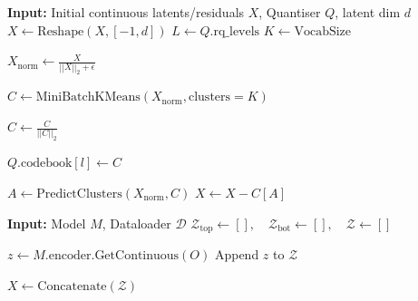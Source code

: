 \label{sec:codebook-priors}

\begin{algorithm}
\caption{Data-driven Codebook Initialisation via K-Means.}
\label{alg:codebook-priors}
\begin{algorithmic}[1]
    \State \textbf{Input:} Initial continuous latents/residuals $X$, Quantiser $Q$, latent dim $d$
    \State $X \gets \text{Reshape}(X, [-1, d])$ 
    \State $L \gets Q.\text{rq\_levels}$
    \State $K \gets \text{VocabSize}$
    
        \State $X_{\text{norm}} \gets \frac{X}{||X||_2 + \epsilon}$ 
        
        \State $C \gets \text{MiniBatchKMeans}(X_{\text{norm}}, \text{clusters}=K)$ 
        
            \State $C \gets \frac{C}{||C||_2}$ 
        \EndIf
        
        \State $Q.\text{codebook}[l] \gets C$ 
        
        \State $A \gets \text{PredictClusters}(X_{\text{norm}}, C)$ 
        \State $X \gets X - C[A]$ 
    \EndFor
\EndProcedure

\vspace{2mm}

    \State \textbf{Input:} Model $M$, Dataloader $\mathcal{D}$
    \State $\mathcal{Z}_{\text{top}} \gets [], \quad \mathcal{Z}_{\text{bot}} \gets [], \quad \mathcal{Z} \gets []$
    
    \State {}
        \State $z \gets M.\text{encoder}.\text{GetContinuous}(O)$
        \State Append $z$ to $\mathcal{Z}$
    \EndFor
    
    \State {}
    \State $X \gets \text{Concatenate}(\mathcal{Z})$
    \State {}
    
\EndProcedure
\end{algorithmic}
\end{algorithm}
